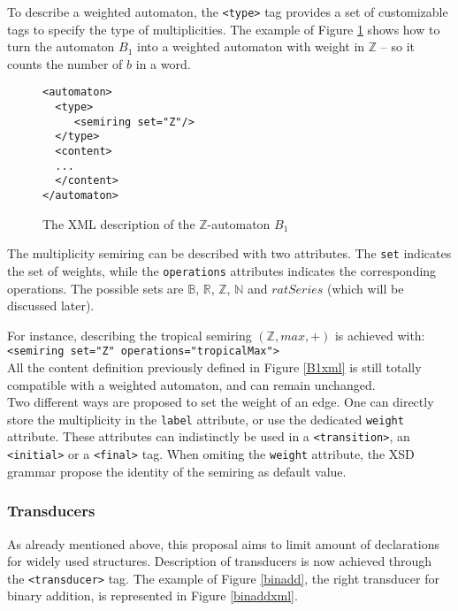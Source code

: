 \documentclass[a4paper]{article}
\begin{document}
To describe a weighted automaton, the \verb|<type>| tag provides a set
of customizable tags to specify the type of multiplicities. The example
of Figure \ref{B1Zxml} shows how to turn the automaton $B_1$ into a
weighted automaton with weight in ${\mathbb Z}$ -- so it counts the
number of $b$ in a word.

{\small

\begin{figure}[h]
  \begin{center}
\begin{verbatim}
<automaton>
  <type>
     <semiring set="Z"/>
  </type>
  <content>
  ...
  </content>
</automaton>
\end{verbatim}

\caption{The XML description of the $\mathbb{Z}$-automaton $B_1$}
\label{B1Zxml}
  \end{center}
\end{figure}

}

The multiplicity semiring can be described with two attributes. The
\verb|set| indicates the set of weights, while the \verb|operations|
attributes indicates the corresponding operations. The possible sets
are ${\mathbb B}$, ${\mathbb R}$, ${\mathbb Z}$, ${\mathbb N}$ and
$ratSeries$ (which will be discussed later). 

For instance, describing the tropical semiring $({\mathbb Z}, max, +)$
is achieved with: {\small
\verb|<semiring set="Z" operations="tropicalMax">|}\\


All the content definition previously defined in Figure \ref{B1xml} is
still totally compatible with a weighted automaton, and can remain
unchanged. \\

Two different ways are proposed to set the weight of an edge. One can
directly store the multiplicity in the \verb|label| attribute, or use
the dedicated \verb|weight| attribute. These attributes can
indistinctly be used in a \verb|<transition>|, an
\verb|<initial>| or a \verb|<final>| tag. When omiting the
\verb|weight| attribute, the XSD grammar propose the identity of
the semiring as default value.

%
\subsubsection{Transducers}

As already mentioned above, this proposal aims to limit amount of
declarations for widely used structures. Description of transducers is
now achieved through the \verb|<transducer>| tag. The example of
Figure \ref{binadd}, the right transducer for binary addition, is
represented in Figure \ref{binaddxml}. 
\end{document}
